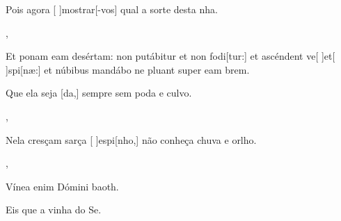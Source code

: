 {    {\item {}Pois agora [ ]{mos}{trar}[-vos] qual a sorte desta nha.~\Responsorium},
  {\item {}Et ponam eam desértam: non putábitur et non fodi[tur:] et ascéndent ve[ ]{et}[ ]{spi}[næ:] et núbibus mandábo ne pluant super eam brem.~\Responsorium}%
    {\item {}Que ela seja [da,] sempre sem poda e culvo.~\Responsorium},
  {}%
    {\item {}Nela cresçam sarça [ ]{es}{pi}[nho,] não conheça chuva e orlho.~\Responsorium},
  {\item {}Vínea enim Dómini baoth.~\Responsorium}%
    {\item {}Eis que a vinha do Se.~\Responsorium}
}